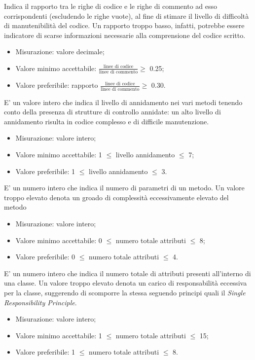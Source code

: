 			Indica il rapporto tra le righe di codice e le righe di commento ad esso corrispondenti (escludendo le righe vuote), al fine di stimare il livello di difficoltà di manutenibilità del codice. Un rapporto troppo basso, infatti, potrebbe essere indicatore di scarse informazioni necessarie alla comprensione del codice scritto.
		\begin{itemize}
			\item{Misurazione: valore decimale;}
			\item{Valore minimo accettabile: $\displaystyle\frac{\mbox{linee di codice}}{\mbox{linee di commento}} \geq$ 0.25;}
			\item{Valore preferibile: rapporto $\displaystyle\frac{\mbox{linee di codice}}{\mbox{linee di commento}} \geq$ 0.30.}
		\end{itemize}

			E' un valore intero che indica il livello di annidamento nei vari metodi tenendo conto della presenza di strutture di controllo annidate: un alto livello di annidamento risulta in codice complesso e di difficile manutenzione.
		\begin{itemize}
			\item{Misurazione: valore intero;}
			\item{Valore minimo accettabile: 1 $\leq$ livello annidamento $\leq$ 7;}
			\item{Valore preferibile: 1 $\leq$ livello annidamento $\leq$ 3.}
		\end{itemize}
			
			E' un numero intero che indica il numero di parametri di un metodo. Un valore troppo elevato denota un groado di complessità eccessivamente elevato del metodo
		\begin{itemize}
			\item{Misurazione: valore intero;}
			\item{Valore minimo accettabile: 0 $\leq$ numero totale attributi $\leq$ 8;}
			\item{Valore preferibile: 0 $\leq$ numero totale attributi $\leq$ 4.}
		\end{itemize}
			
			E' un numero intero che indica il numero totale di attributi presenti all'interno di una classe. Un valore troppo elevato denota un carico di responsabilità eccessiva per la classe, suggerendo di scomporre la stessa seguendo principi quali il \textit{Single Responsibility Principle}.
		\begin{itemize}
			\item{Misurazione: valore intero;}
			\item{Valore minimo accettabile: 1 $\leq$ numero totale attributi $\leq$ 15;}
			\item{Valore preferibile: 1 $\leq$ numero totale attributi $\leq$ 8.}
		\end{itemize}

